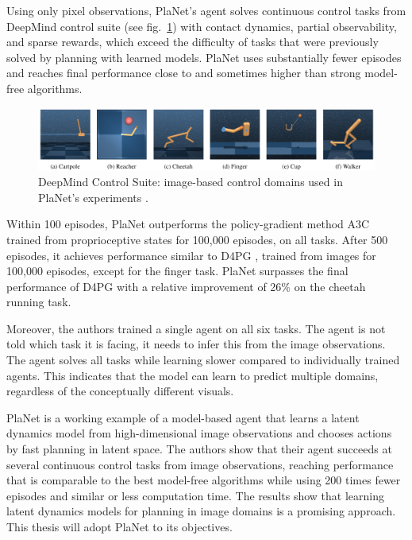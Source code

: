 Using only pixel observations, PlaNet's agent solves continuous control tasks from DeepMind control suite (see fig.~\ref{Fig.DeepMindControlSuite}) with contact dynamics, partial observability, and sparse rewards, which exceed the difficulty of tasks that were previously solved by planning with learned models. PlaNet uses substantially fewer episodes and reaches final performance close to and sometimes higher than strong model-free algorithms.

\begin{figure}[H]
\includegraphics[width=1.0\textwidth,keepaspectratio]{figures/PlaNet/benchmarks.png}
\caption[DeepMind Control Suite]{DeepMind Control Suite: image-based control domains used in PlaNet's experiments \protect\cite{Algo.PlaNet}.}
\label{Fig.DeepMindControlSuite}
\end{figure}

Within 100 episodes, PlaNet outperforms the policy-gradient method A3C \cite{Algo.A3C} trained from proprioceptive states for 100,000 episodes, on all tasks. After 500 episodes, it achieves performance similar to D4PG \cite{Algo.D4PG}, trained from images for 100,000 episodes, except for the finger task. PlaNet surpasses the final performance of D4PG with a relative improvement of 26\% on the cheetah running task.

Moreover, the authors trained a single agent on all six tasks. The agent is not told which task it is facing, it needs to infer this from the image observations. The agent solves all tasks while learning slower compared to individually trained agents. This indicates that the model can learn to predict multiple domains, regardless of the conceptually different visuals.

PlaNet is a working example of a model-based agent that learns a latent dynamics model from high-dimensional image observations and chooses actions by fast planning in latent space. The authors show that their agent succeeds at several continuous control tasks from image observations, reaching performance that is comparable to the best model-free algorithms while using 200 times fewer episodes and similar or less computation time. The results show that learning latent dynamics models for planning in image domains is a promising approach. This thesis will adopt PlaNet to its objectives.

